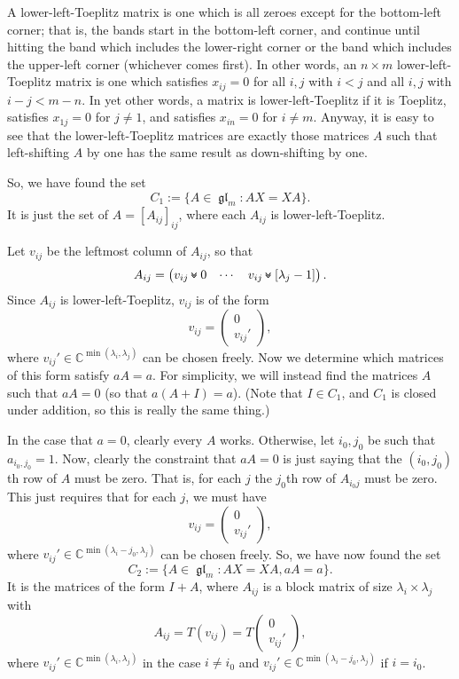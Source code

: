 \documentclass[12pt,psamsfonts]{article}
\newcommand{\leftshift}{\,\texttt{<<}\,}
\newcommand{\downshift}{\mathbin{\rotatebox[origin=c]{90}{\leftshift}}}
\DeclareMathOperator{\gl}{\mathfrak{gl}}
\begin{document}
A lower-left-Toeplitz matrix is one which is all zeroes except for the bottom-left corner; that is, the bands start in the bottom-left corner, and continue until hitting the band which includes the lower-right corner or the band which includes the upper-left corner (whichever comes first).
In other words, an \(n \times m\) lower-left-Toeplitz matrix is one which satisfies \(x_{ij} = 0\) for all \(i,j\) with \(i < j\) and all \(i,j\) with \(i - j < m - n\).
In yet other words, a matrix is lower-left-Toeplitz if it is Toeplitz, satisfies \(x_{1j} = 0\) for \(j \neq 1\), and satisfies \(x_{in} = 0\) for \(i \neq m\).
Anyway, it is easy to see that the lower-left-Toeplitz matrices are exactly those matrices \(A\) such that left-shifting \(A\) by one has the same result as down-shifting by one.
\par So, we have found the set 
\[C_1 := \{A \in \gl_m : AX = XA\}.\]
It is just the set of \(A = [A_{ij}]_{ij}\), where each \(A_{ij}\) is lower-left-Toeplitz.
\par Let \(v_{ij}\) be the leftmost column of \(A_{ij}\), so that
\[A_{ij} = \begin{pmatrix}
    v_{ij} \downshift 0 & \cdots & v_{ij} \downshift [\lambda_j - 1]
\end{pmatrix}.\]
Since \(A_{ij}\) is lower-left-Toeplitz, \(v_{ij}\) is of the form 
\[v_{ij} = \begin{pmatrix}
    0\\
    v_{ij}'
\end{pmatrix},\]
where \(v_{ij}' \in \mathbb{C}^{\min(\lambda_i, \lambda_j)}\) can be chosen freely.
Now we determine which matrices of this form satisfy \(aA = a\).
For simplicity, we will instead find the matrices \(A\) such that \(aA = 0\) (so that \(a(A + I) = a\)).
(Note that \(I \in C_1\), and \(C_1\) is closed under addition, so this is really the same thing.)
\par In the case that \(a = 0\), clearly every \(A\) works.
Otherwise, let \(i_0, j_0\) be such that \(a_{i_0,j_0} = 1\).
Now, clearly the constraint that \(aA = 0\) is just saying that the \((i_0,j_0)\)th row of \(A\) must be zero.
That is, for each \(j\) the \(j_0\)th row of \(A_{i_0j}\) must be zero.
This just requires that for each \(j\), we must have 
\[v_{ij} = \begin{pmatrix}
    0\\
    v_{ij}'
\end{pmatrix},\]
where \(v_{ij}' \in \mathbb{C}^{\min(\lambda_i - j_0, \lambda_j)}\) can be chosen freely.
So, we have now found the set 
\[C_2 := \{A \in \gl_m : AX = XA, aA = a\}.\]
It is the matrices of the form \(I + A\), where \(A_{ij}\) is a block matrix of size \(\lambda_i \times \lambda_j\) with 
\[A_{ij} = T(v_{ij}) = T\begin{pmatrix}
    0\\
    v_{ij}'
\end{pmatrix},\]
where \(v_{ij}' \in \mathbb{C}^{\min(\lambda_i, \lambda_j)}\) in the case \(i \neq i_0\) and \(v_{ij}' \in \mathbb{C}^{\min(\lambda_i - j_0, \lambda_j)}\) if \(i = i_0\).
\end{document}
